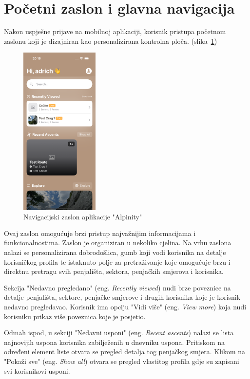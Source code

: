 \section{Početni zaslon i glavna navigacija}

Nakon uspješne prijave na mobilnoj aplikaciji, korisnik pristupa početnom zaslonu koji je dizajniran kao personalizirana kontrolna ploča. (slika~\ref{fig:početni_zaslon})

\begin{figure}[H]
    \centering
    \includegraphics[width=0.35\textwidth]{images/implementacija/main_nav_1.png}
    \caption{Navigacijski zaslon aplikacije "Alpinity"}
    \label{fig:početni_zaslon}
\end{figure}

Ovaj zaslon omogućuje brzi pristup najvažnijim informacijama i funkcionalnostima. Zaslon je organiziran u nekoliko cjelina. Na vrhu zaslona nalazi se personalizirana dobrodošlica, gumb koji vodi korisnika na detalje korisničkog profila te istaknuto polje za pretraživanje koje omogućuje brzu i direktnu pretragu svih penjališta, sektora, penjačkih smjerova i korisnika.

Sekcija "Nedavno pregledano" (eng. \textit{Recently viewed}) nudi brze poveznice na detalje penjališta, sektore, penjačke smjerove i drugih korisnika koje je korisnik nedavno pregledavao. Korisnik ima opciju "Vidi više" (eng. \textit{View more}) koja nudi korisniku prikaz više poveznica koje je posjetio.

Odmah ispod, u sekciji "Nedavni usponi" (eng. \textit{Recent ascents}) nalazi se lista najnovijih uspona korisnika zabilježenih u dnevniku uspona. Pritiskom na određeni element liste otvara se pregled detalja tog penjačkog smjera. Klikom na "Pokaži sve" (eng. \textit{Show all}) otvara se pregled vlastitog profila gdje su zapisani svi korisnikovi usponi. 

